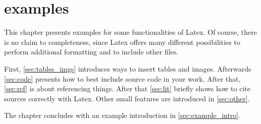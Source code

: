 \chapter{examples}
\label{chap:examples}

This chapter presents examples for some functionalities of Latex.
Of course, there is no claim to completeness, since Latex offers many different possibilities to perform additional formatting and to include other files.

First, \autoref{sec:tables_imgs} introduces ways to insert tables and images. Afterwards \autoref{sec:code} presents how to best include source code in your work.
After that, \autoref{sec:ref} is about referencing things. After that \autoref{sec:lit} briefly shows how to cite sources correctly with Latex. Other small features are introduced in \autoref{sec:other}.

The chapter concludes with an example introduction in \autoref{sec:example_intro}.

